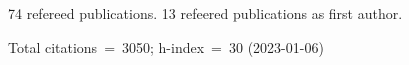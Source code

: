 74 refereed publications. 13 refeered publications as first author.

Total citations~=~3050; h-index~=~30 (2023-01-06)